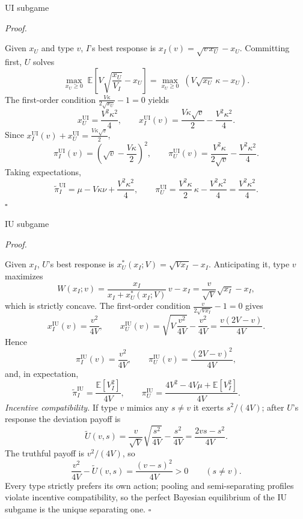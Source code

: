 \documentclass[10pt]{beamer}
\newcommand{\E}{\mathbb{E}}
\newcommand{\pt}{\widetilde{\pi}}
\newcommand{\rUI}{\mathrm{UI}}
\newcommand{\rIU}{\mathrm{IU}}
\renewenvironment{proof}{%
  \par\smallskip\noindent\textit{Proof.}\hspace{0.6em}\ignorespaces
}{%
  \unskip\nobreak\hfill$\square$\par\smallskip
}
\begin{document}
\begin{frame}[allowframebreaks]{$\rUI$ subgame}\label{prf:ui}
  \begin{proof}
    Given $x_U$ and type $v$, $I$'s best response is
    $x_I(v) = \sqrt{v\,x_U} - x_U$. Committing first, $U$ solves
    \[
      \max_{x_U\ge 0}\;
      \E\!\left[ V\sqrt{\dfrac{x_U}{V_I}} - x_U \right]
      = \max_{x_U\ge 0}\; \left( V\sqrt{x_U}\,\kappa - x_U \right).
    \]
    The first-order condition $\frac{V\kappa}{2\sqrt{x_U}} - 1 = 0$
    yields
    \[
      x_U^{\rUI} = \dfrac{V^2\kappa^2}{4},
      \qquad
      x_I^{\rUI}(v) = \dfrac{V\kappa\sqrt{v}}{2}
                      - \dfrac{V^2\kappa^2}{4}.
    \]
    Since $x_I^{\rUI}(v)+x_U^{\rUI} = \frac{V\kappa\sqrt{v}}{2}$,
    \[
      \pi_I^{\rUI}(v) = \left( \sqrt{v} - \dfrac{V\kappa}{2} \right)^{2},
      \qquad
      \pi_U^{\rUI}(v) = \dfrac{V^2\kappa}{2\sqrt{v}}
                        - \dfrac{V^2\kappa^2}{4}.
    \]
    Taking expectations,
    \[
      \pt_I^{\rUI} = \mu - V\kappa\nu + \dfrac{V^2\kappa^2}{4},
      \qquad
      \pi_U^{\rUI} = \dfrac{V^2\kappa}{2}\,\kappa
                     - \dfrac{V^2\kappa^2}{4}
                   = \dfrac{V^2\kappa^2}{4}.
    \]
  \end{proof}
\end{frame}

\begin{frame}[allowframebreaks]{$\rIU$ subgame}\label{prf:iu}
  \begin{proof}
    Given $x_I$, $U$'s best response is
    $x_U^{*}(x_I;V) = \sqrt{V x_I} - x_I$. Anticipating it, type $v$
    maximizes
    \[
      W(x_I;v)
      = \dfrac{x_I}{x_I + x_U^{*}(x_I;V)}\, v - x_I
      = \dfrac{v}{\sqrt{V}}\sqrt{x_I} - x_I ,
    \]
    which is strictly concave. The first-order condition
    $\frac{v}{2\sqrt{V x_I}} - 1 = 0$ gives
    \[
      x_I^{\rIU}(v) = \dfrac{v^2}{4V},
      \qquad
      x_U^{\rIU}(v)
      = \sqrt{V\,\dfrac{v^2}{4V}} - \dfrac{v^2}{4V}
      = \dfrac{v\left(2V-v\right)}{4V}.
    \]
    Hence
    \[
      \pi_I^{\rIU}(v) = \dfrac{v^2}{4V},
      \qquad
      \pi_U^{\rIU}(v) = \dfrac{\left(2V-v\right)^2}{4V},
    \]
    and, in expectation,
    \[
      \pt_I^{\rIU} = \dfrac{\E\!\left[V_I^2\right]}{4V},
      \qquad
      \pi_U^{\rIU}
      = \dfrac{4V^2 - 4V\mu + \E\!\left[V_I^2\right]}{4V}.
    \]
    \emph{Incentive compatibility.} If type $v$ mimics any $s\neq v$ it
    exerts $s^2/(4V)$; after $U$'s response the deviation payoff is
    \[
      \widetilde{U}(v,s)
      = \dfrac{v}{\sqrt{V}}\sqrt{\dfrac{s^2}{4V}} - \dfrac{s^2}{4V}
      = \dfrac{2vs - s^2}{4V}.
    \]
    The truthful payoff is $v^2/(4V)$, so
    \[
      \dfrac{v^2}{4V} - \widetilde{U}(v,s)
      = \dfrac{\left(v-s\right)^2}{4V} > 0
      \qquad (s\neq v).
    \]
    Every type strictly prefers its own action; pooling and
    semi-separating profiles violate incentive compatibility, so the
    perfect Bayesian equilibrium of the $\rIU$ subgame is the unique
    separating one.
  \end{proof}
\end{frame}
\end{document}

